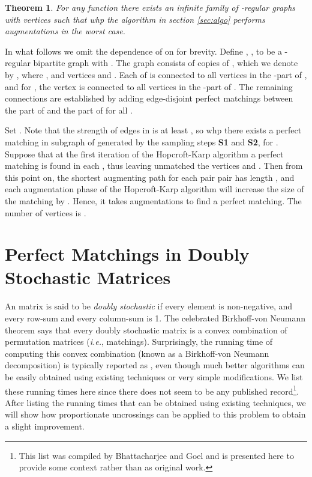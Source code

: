 \documentclass[11pt]{article}
\newtheorem{theorem}{Theorem}[section]
\newenvironment{proof}{{\bf Proof:}}{\par}
\begin{document}
\begin{theorem}\label{thm:lowerbound}
For any function  there exists an infinite family of -regular graphs with  vertices such that whp the algorithm in section \ref{sec:algo} performs  augmentations in the worst case. 
\end{theorem}
\begin{proof}
 In what follows we omit the dependence of  on  for brevity. Define , , to be a -regular bipartite graph with .  The graph  consists of  copies of , which we denote by , where , and  vertices  and . Each of  is connected to all  vertices in the -part of , and 
 for  , the vertex   is connected to all vertices in the -part of . The remaining connections are established by adding  edge-disjoint perfect matchings between the  part of  and the  part of  for all .
 
 Set . Note that the strength of edges in  is at least , so whp there exists a perfect matching in subgraph of  generated 
 by the sampling steps \textbf{S1} and \textbf{S2}, for . Suppose that at the first iteration of the Hopcroft-Karp algorithm a perfect matching is found in each , thus leaving unmatched the vertices   and .
 Then from this point on, the shortest augmenting path for each pair pair  has length , and each augmentation phase of the Hopcroft-Karp algorithm
 will increase the size of the matching by . Hence, it takes  augmentations to find a perfect matching. The number of vertices is . 
\end{proof}




\section{Perfect Matchings in Doubly Stochastic Matrices}
\label{sec:bvn}
An  matrix  is said to be {\em doubly stochastic} if every element is
non-negative, and every row-sum and every column-sum is 1. The celebrated
Birkhoff-von Neumann theorem says that every doubly stochastic matrix is a
convex combination of permutation matrices ({\em i.e.}, matchings). Surprisingly, the
running time of computing this convex combination (known as a Birkhoff-von
Neumann decomposition) is typically reported as , even though
much better algorithms can be easily obtained using existing techniques or
very simple modifications. We list these running times here since there does
not seem to be any published record\footnote{This list was compiled by
  Bhattacharjee and Goel and is presented here to provide some context rather
  than as original work.}. After listing the running times that can be obtained
using existing techniques, we will show how proportionate uncrossings can be
applied to this problem to obtain a slight improvement.
\end{document}
